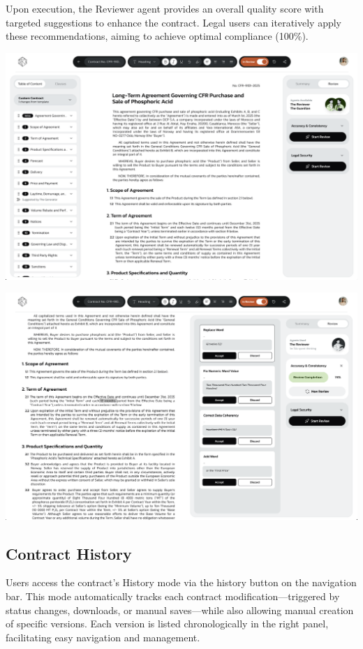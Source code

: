 Upon execution, the Reviewer agent provides an overall quality score with targeted suggestions to enhance the contract. Legal users can iteratively apply these recommendations, aiming to achieve optimal compliance (100\%).

\begin{center}
    \centering
    \includegraphics[width=1\textwidth]{Images/Reviewer Agent View.png}
    \label{fig:reviewer_agent_view}
\end{center}

\begin{center}
    \centering
    \includegraphics[width=1\textwidth]{Images/Reviewer Agent Result.png}
    \label{fig:reviewer_agent_result}
\end{center}

\subsection{Contract History}
Users access the contract's History mode via the history button on the navigation bar. This mode automatically tracks each contract modification—triggered by status changes, downloads, or manual saves—while also allowing manual creation of specific versions. Each version is listed chronologically in the right panel, facilitating easy navigation and management.

